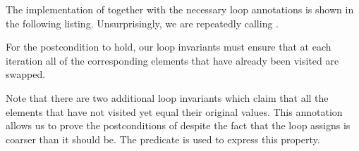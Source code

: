 The implementation of  together with the necessary
loop annotations is shown in the following listing.
Unsurprisingly, we are repeatedly calling .



For the postcondition  to hold, 
our loop invariants must ensure that at each iteration all of the
corresponding elements that have already been visited are swapped.

Note that there are two additional loop invariants which claim
that all the elements that have not visited yet equal their original values.
This annotation allows us to prove the postconditions of \swapranges
despite the fact that the loop assigns is coarser than it should be.
The predicate  is used to express this property.

\clearpage

